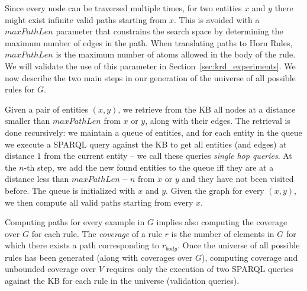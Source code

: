 Since every node can be traversed multiple times, for two entities $x$ and $y$ there might exist infinite valid paths starting from $x$. This is avoided with a $maxPathLen$ parameter that constrains the search space by determining the maximum number of edges in the path. When translating paths to Horn Rules, $maxPathLen$ is the maximum number of atoms allowed in the body of the rule.
We will validate the use of this parameter in Section~\ref{sec:krd_experiments}. 
We now describe the two main steps in our generation of the universe of all possible rules for $G$. 

\noindent {}
Given a pair of entities $(x,y)$, we retrieve from the KB all nodes at a distance smaller than $maxPathLen$ from $x$ or $y$, along with their edges. The retrieval is done recursively: we maintain a queue of entities, and for each entity in the queue we execute a SPARQL query against the KB to get all entities (and edges) at distance $1$ from the current entity -- we call these queries \emph{single hop queries}. At the $n$-th step, we add the new found entities to the queue iff they are at a distance less than $maxPathLen-n$ from $x$ or $y$ and they have not been visited before. The queue is initialized with $x$ and $y$. 
%
Given the graph for every $(x,y)$, we then compute all valid paths starting from every $x$. 

\noindent {}
Computing paths for every example in $G$ implies also computing the coverage over $G$ for each rule. The {\em coverage} of a rule $r$ is the number of elements in $G$ for which there exists a path corresponding to $r_{body}$. 
%
%
Once the universe of all possible rules has been generated (along with coverages over $G$), computing coverage and unbounded coverage over $V$ requires only the execution of two SPARQL queries against the KB for each rule in the universe (validation queries).

